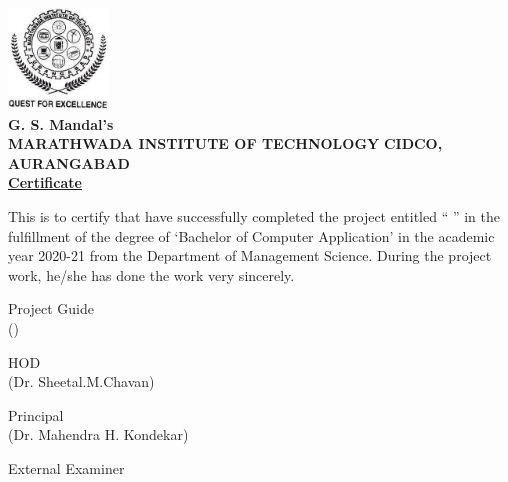 \newpage
\thispagestyle{empty}

\begin{center}
\includegraphics[width=0.20\textwidth]{./mit}\\
\small \textbf{G. S. Mandal’s} \\[0.1in]
\large \textbf {MARATHWADA INSTITUTE OF TECHNOLOGY}
\large \textbf{CIDCO, AURANGABAD}\\

\vspace{1cm}
\normalsize \textbf {\underline {Certificate}}\\[1cm]
\end{center}
\normalsize This is to certify that \hspace{5cm} have successfully completed the project entitled “ \hspace{5cm} ” in the fulfillment of the degree of ‘Bachelor of Computer Application’ in the academic year 2020-21 from the Department of Management Science. 
\newline
\newline
During the project work, he/she has done the work very sincerely.
\\[1.0cm]

\begin{flushright}
Project Guide \hspace{2cm} \\
(\hspace{2.5cm})\\[1.5cm]
\end{flushright}

\begin{flushleft}
\hspace{1.5cm} HOD\\
(Dr. Sheetal.M.Chavan)
\end{flushleft}

\begin{flushright}
	Principal \hspace{2.5cm}\\
	(Dr. Mahendra H. Kondekar)
\end{flushright}

\begin{flushleft}
	External Examiner
\end{flushleft}